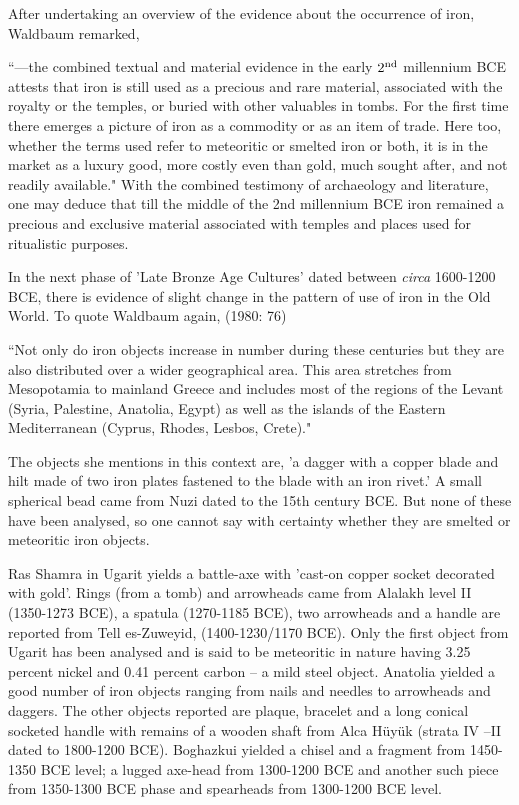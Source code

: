 {After undertaking an overview of the evidence about the occurrence of iron, Waldbaum remarked, 

{\footnotesize ``---the combined textual and material evidence in the early $2^{\rm nd}$ millennium BCE attests that iron is still used as a precious and rare material, associated with the royalty or the temples, or buried with other valuables in tombs. For the first time there emerges a picture of iron as a commodity or as an item of trade. Here too, whether the terms used refer to meteoritic or smelted iron or both, it is in the market as a luxury good, more costly even than gold, much sought after, and not readily available."} With the combined testimony of archaeology and literature, one may deduce that till the middle of the 2nd millennium BCE iron remained a precious and exclusive material associated with temples and places used for ritualistic purposes.

In the next phase of 'Late Bronze Age Cultures’ dated  between \textit{circa} 1600-1200 BCE, there is evidence of slight change in the pattern of use of iron in the Old World. To quote Waldbaum again, (1980: 76)

{\footnotesize ``Not only do iron objects increase in number during these centuries but they are also distributed over a wider geographical area. This area stretches from Mesopotamia to mainland Greece and includes most of the regions of the Levant (Syria, Palestine, Anatolia, Egypt) as well as the islands of the Eastern Mediterranean (Cyprus, Rhodes, Lesbos, Crete)."}

The objects she mentions in this context are, 'a dagger with a copper blade and hilt made of two iron plates fastened to the blade with an iron rivet.' A small spherical bead came from Nuzi dated to the 15th century BCE. But none of these have been analysed, so one cannot say with certainty whether they are smelted or meteoritic iron objects.

Ras Shamra in Ugarit yields a battle-axe with 'cast-on copper socket decorated with gold'. Rings (from a tomb) and arrowheads came from Alalakh level II (1350-1273 BCE), a spatula (1270-1185 BCE), two arrowheads and a handle are reported from Tell es-Zuweyid, (1400-1230/1170 BCE). Only the first object from Ugarit has been analysed and is said to be meteoritic in nature having 3.25 percent nickel and 0.41 percent carbon – a mild steel object. Anatolia yielded a good number of iron objects ranging from nails and needles to arrowheads and daggers. The other objects reported are plaque, bracelet and a long conical socketed handle with remains of a wooden shaft from Alca Hüyük (strata IV –II dated to 1800-1200 BCE). Boghazkui yielded a chisel and a fragment from 1450-1350 BCE level; a lugged axe-head from 1300-1200 BCE and another such piece from 1350-1300 BCE phase and spearheads from 1300-1200 BCE level.

}
